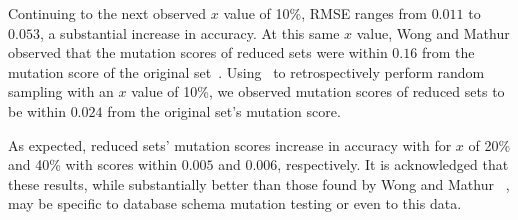 Continuing to the next observed $x$ value of 10\%, RMSE ranges from $0.011$ to $0.053$, a
substantial increase in accuracy. At this same  $x$ value, Wong and Mathur observed that the mutation scores of reduced sets were
within $0.16$ from the mutation score of the original set~\cite{mathur1994empirical, wong1993mutation}. Using \mr~to retrospectively
perform random sampling with an $x$ value of 10\%, we observed mutation scores of reduced sets to be within $0.024$ from the original
set's mutation score.

As expected, reduced sets' mutation scores increase in accuracy with for $x$ of 20\% and 40\% with scores within $0.005$ and $0.006$,
respectively. It is acknowledged that these results, while substantially better than those found by Wong and Mathur
~\cite{mathur1994empirical, wong1993mutation}, may be specific to database schema mutation testing or even to this data.


